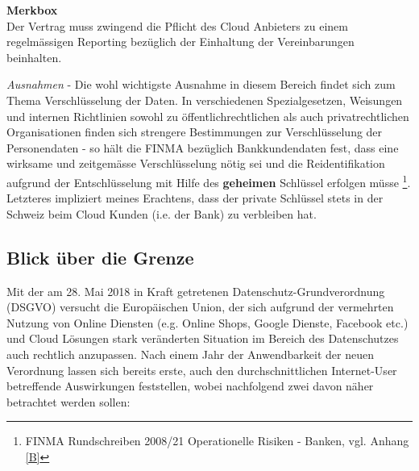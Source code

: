 \documentclass[a4paper,pointlessnumbers]{scrreprt}
\newcommand{\merkbox}[2][0.8\textwidth]{ \begin{center} \begin{tcolorbox}[enhanced, drop fuzzy midday shadow, width={#1}, opacityframe=0.5, colframe=BrickRed, colback=white] {\ECFTeenSpirit \color{BrickRed}\textbf{Merkbox} \qquad {\tiny das gilt es zu beachten}} \\  #2 \end{tcolorbox} \end{center}}
\begin{document}
\merkbox[0.7\textwidth]{Der Vertrag muss zwingend die Pflicht des Cloud Anbieters zu einem regelmässigen Reporting bezüglich der Einhaltung der Vereinbarungen beinhalten.}

\textit{Ausnahmen} - Die wohl wichtigste Ausnahme in diesem Bereich findet sich zum Thema Verschlüsselung der Daten. In verschiedenen Spezialgesetzen, Weisungen und internen Richtlinien sowohl zu öffentlichrechtlichen als auch privatrechtlichen Organisationen finden sich strengere Bestimmungen zur Verschlüsselung der Personendaten - so hält die FINMA bezüglich Bankkundendaten fest, dass \glqq eine wirksame und zeitgemässe Verschlüsselung\grqq{} nötig sei und \glqq die Reidentifikation aufgrund der Entschlüsselung mit Hilfe des \textbf{geheimen} Schlüssel\grqq{} erfolgen müsse \footnote{FINMA Rundschreiben 2008/21 Operationelle Risiken - Banken, vgl. Anhang \ref{B}}. Letzteres impliziert meines Erachtens, dass der private Schlüssel stets in der Schweiz beim Cloud Kunden (i.e. der Bank) zu verbleiben hat.

\subsection{Blick über die Grenze}
Mit der am 28. Mai 2018 in Kraft getretenen Datenschutz-Grundverordnung (DSGVO) versucht die Europäischen Union, der sich aufgrund der vermehrten Nutzung von Online Diensten (e.g. Online Shops, Google Dienste, Facebook etc.) und Cloud Lösungen stark veränderten Situation im Bereich des Datenschutzes auch rechtlich anzupassen. Nach einem Jahr der Anwendbarkeit der neuen Verordnung lassen sich bereits erste, auch den durchschnittlichen Internet-User betreffende Auswirkungen feststellen, wobei nachfolgend zwei davon näher betrachtet werden sollen:
\end{document}
